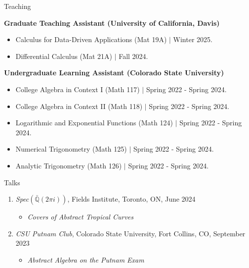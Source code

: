 \documentclass[
	11pt, %
]{resume} %
\newcommand{\Q}{\mathbb{Q}}
\begin{document}
\begin{rSection}{Teaching}


	\textbf{Graduate Teaching Assistant (University of California, Davis)}
	\begin{itemize}
		\item{Calculus for Data-Driven Applications (Mat 19A) $\mid$ Winter 2025.}
		\item{Differential Calculus (Mat 21A) $\mid$ Fall 2024.}
	\end{itemize}

	\textbf{Undergraduate Learning Assistant (Colorado State University)}
	\begin{itemize}
		\item{College Algebra in Context I (Math 117)  $\mid$ Spring 2022 - Spring 2024.}
		\item{College Algebra in Context II (Math 118) $\mid$ Spring 2022 - Spring 2024.}
		\item{Logarithmic and Exponential Functions (Math 124) $\mid$ Spring 2022 - Spring 2024.}
		\item{Numerical Trigonometry (Math 125) $\mid$ Spring 2022 - Spring 2024.}
		\item{Analytic Trigonometry (Math 126) $\mid$ Spring 2022 - Spring 2024.}\\
	\end{itemize}
	
\end{rSection}


\begin{rSection}{Talks}

	\begin{enumerate}

		\item \textit{Spec}$(\bar{\Q}(2\pi i))$, Fields Institute, Toronto, ON, June 2024
		\begin{itemize}
			\item \textit{Covers of Abstract Tropical Curves}
		\end{itemize}

		\item \textit{CSU Putnam Club}, Colorado State University, Fort Collins, CO, September 2023 %
		\begin{itemize}
			\item \textit{Abstract Algebra on the Putnam Exam}\\
		\end{itemize}

	\end{enumerate}
	
\end{rSection}
\end{document}
